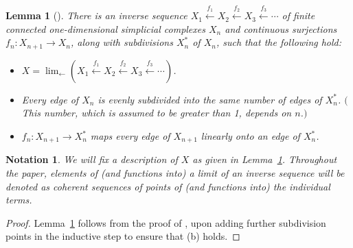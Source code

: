 \documentclass{amsart}
\newtheorem{lemma}[theorem]{Lemma}
\theoremstyle{definition}
\newtheorem*{notation}{Notation}
\theoremstyle{remark}
\numberwithin{equation}{section}
\begin{document}
\begin{lemma}[\cite{R}]\label{setup} There is an inverse sequence $X_1\stackrel{f_1}{\longleftarrow} X_2 \stackrel{f_2}{\longleftarrow} X_3 \stackrel{f_3}{\longleftarrow} \cdots$ of \linebreak  finite connected one-dimensional simplicial complexes $X_n$ and continuous surjections $f_n:X_{n+1}\rightarrow X_n$, along with subdivisions $X^\ast_n$ of $X_n$, such that the following hold:
\begin{itemize}
\item[(a)] $\displaystyle X=\lim_{\longleftarrow} \left(X_1\stackrel{f_1}{\longleftarrow} X_2 \stackrel{f_2}{\longleftarrow} X_3 \stackrel{f_3}{\longleftarrow} \cdots\right)$.
    \item[(b)] Every edge of $X_n$ is evenly subdivided into
    the same number of edges of $X^\ast_n$. $($This number, which is assumed to be greater than 1, depends on $n$.$)$\vspace{2pt}

\item[(c)]   $f_n:X_{n+1}\rightarrow X^\ast_n$
maps every edge of $X_{n+1}$ linearly onto an edge of $X^\ast_n$.
\end{itemize}
\end{lemma}

\begin{notation}\sl We will fix a description of $X$ as given in Lemma~\ref{setup}. Throughout the paper,
elements of (and functions into) a limit of an inverse sequence will be denoted as coherent sequences of points of (and functions into) the individual terms.
\end{notation}

\begin{proof} Lemma~\ref{setup} follows from the proof of \cite[Theorem~2]{R}, upon adding further subdivision points in the inductive step \cite[Theorem~1]{R}  to ensure that (b) holds.
\end{proof}
\end{document}
